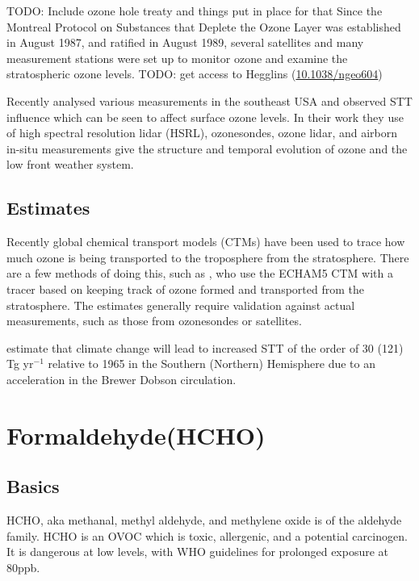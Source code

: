     TODO: Include ozone hole treaty and things put in place for that
    Since the Montreal Protocol on Substances that Deplete the Ozone Layer was established in August 1987, and ratified in August 1989, several satellites and many measurement stations were set up to monitor ozone and examine the stratospheric ozone levels.
    TODO: get access to Hegglins (\url{10.1038/ngeo604})
    
    Recently \cite{Kuang2017} analysed various measurements in the southeast USA and observed STT influence which can be seen to affect surface ozone levels.
    In their work they use of high spectral resolution lidar (HSRL), ozonesondes, ozone lidar, and airborn in-situ measurements give the structure and temporal evolution of ozone and the low front weather system.
  \subsection{Estimates}
    
    Recently global chemical transport models (CTMs) have been used to trace how much ozone is being transported to the troposphere from the stratosphere.
    There are a few methods of doing this, such as \citet{Ojha2016}, who use the ECHAM5 CTM with a tracer based on keeping track of ozone formed and transported from the stratosphere.
    The estimates generally require validation against actual measurements, such as those from ozonesondes or satellites.
    
  \citet{Hegglin2009} estimate that climate change will lead to increased STT of the order of 30 (121) Tg yr$^{-1}$ relative to 1965 in the Southern (Northern) Hemisphere due to an acceleration in the Brewer Dobson circulation.
\section{Formaldehyde(HCHO)}
\label{ch_LitRev:sec:HCHO}
  
  \subsection{Basics}
    HCHO, aka methanal, methyl aldehyde, and methylene oxide is of the aldehyde family.
    HCHO is an OVOC which is toxic, allergenic, and a potential carcinogen. 
    It is dangerous at low levels, with WHO guidelines for prolonged exposure at 80ppb.
    
